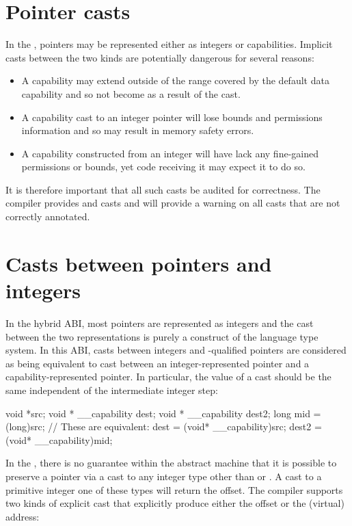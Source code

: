 \section{Pointer casts}

In the \hybridABI{}, pointers may be represented either as integers or capabilities.
Implicit casts between the two kinds are potentially dangerous for several reasons:

\begin{itemize}
	\item A capability may extend outside of the range covered by the default data capability and so not become  as a result of the cast.
	\item A capability cast to an integer pointer will lose bounds and permissions information and so may result in memory safety errors.
	\item A capability constructed from an integer will have lack any fine-gained permissions or bounds, yet code receiving it may expect it to do so.
\end{itemize}

It is therefore important that all such casts be audited for correctness.
The compiler provides  and  casts and will provide a warning on all casts that are not correctly annotated.

\section{Casts between pointers and integers}

In the hybrid ABI, most pointers are represented as integers and the cast between the two representations is purely a construct of the language type system.
In this ABI, casts between integers and -qualified pointers are considered as being equivalent to cast between an integer-represented pointer and a capability-represented pointer.
In particular, the value of a cast should be the same independent of the intermediate integer step:
\begin{csnippet}
	void *src;
	void * __capability dest;
	void * __capability dest2;
	long mid = (long)src;
	// These are equivalent:
	dest = (void* __capability)src;
	dest2 = (void* __capability)mid;
\end{csnippet}

In the \sandboxABI, there is no guarantee within the abstract machine that it is possible to preserve a pointer via a cast to any integer type other than  or .
A cast to a primitive integer one of these types will return the offset.
The compiler supports two kinds of explicit cast that explicitly produce either the offset or the (virtual) address:

